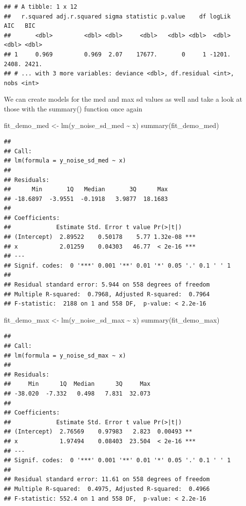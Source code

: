 \documentclass[
]{book}
\newenvironment{Shaded}{\begin{snugshade}}{\end{snugshade}}
\newcommand{\FunctionTok}[1]{\textcolor[rgb]{0.00,0.00,0.00}{#1}}
\newcommand{\NormalTok}[1]{#1}
\newcommand{\OtherTok}[1]{\textcolor[rgb]{0.56,0.35,0.01}{#1}}
\newcommand{\SpecialCharTok}[1]{\textcolor[rgb]{0.00,0.00,0.00}{#1}}
\begin{document}
\begin{verbatim}
## # A tibble: 1 x 12
##   r.squared adj.r.squared sigma statistic p.value    df logLik   AIC   BIC
##       <dbl>         <dbl> <dbl>     <dbl>   <dbl> <dbl>  <dbl> <dbl> <dbl>
## 1     0.969         0.969  2.07    17677.       0     1 -1201. 2408. 2421.
## # ... with 3 more variables: deviance <dbl>, df.residual <int>, nobs <int>
\end{verbatim}

We can create models for the med and max sd values as well and take a look at those with the summary() function once again

\begin{Shaded}
\begin{Highlighting}[]
\NormalTok{fit\_demo\_med }\OtherTok{\textless{}{-}} \FunctionTok{lm}\NormalTok{(y\_noise\_sd\_med }\SpecialCharTok{\textasciitilde{}}\NormalTok{ x)}
\FunctionTok{summary}\NormalTok{(fit\_demo\_med)}
\end{Highlighting}
\end{Shaded}

\begin{verbatim}
## 
## Call:
## lm(formula = y_noise_sd_med ~ x)
## 
## Residuals:
##      Min       1Q   Median       3Q      Max 
## -18.6897  -3.9551  -0.1918   3.9877  18.1683 
## 
## Coefficients:
##             Estimate Std. Error t value Pr(>|t|)    
## (Intercept)  2.89522    0.50178    5.77 1.32e-08 ***
## x            2.01259    0.04303   46.77  < 2e-16 ***
## ---
## Signif. codes:  0 '***' 0.001 '**' 0.01 '*' 0.05 '.' 0.1 ' ' 1
## 
## Residual standard error: 5.944 on 558 degrees of freedom
## Multiple R-squared:  0.7968, Adjusted R-squared:  0.7964 
## F-statistic:  2188 on 1 and 558 DF,  p-value: < 2.2e-16
\end{verbatim}

\begin{Shaded}
\begin{Highlighting}[]
\NormalTok{fit\_demo\_max }\OtherTok{\textless{}{-}} \FunctionTok{lm}\NormalTok{(y\_noise\_sd\_max }\SpecialCharTok{\textasciitilde{}}\NormalTok{ x)}
\FunctionTok{summary}\NormalTok{(fit\_demo\_max)}
\end{Highlighting}
\end{Shaded}

\begin{verbatim}
## 
## Call:
## lm(formula = y_noise_sd_max ~ x)
## 
## Residuals:
##     Min      1Q  Median      3Q     Max 
## -38.020  -7.332   0.498   7.831  32.073 
## 
## Coefficients:
##             Estimate Std. Error t value Pr(>|t|)    
## (Intercept)  2.76569    0.97983   2.823  0.00493 ** 
## x            1.97494    0.08403  23.504  < 2e-16 ***
## ---
## Signif. codes:  0 '***' 0.001 '**' 0.01 '*' 0.05 '.' 0.1 ' ' 1
## 
## Residual standard error: 11.61 on 558 degrees of freedom
## Multiple R-squared:  0.4975, Adjusted R-squared:  0.4966 
## F-statistic: 552.4 on 1 and 558 DF,  p-value: < 2.2e-16
\end{verbatim}
\end{document}
